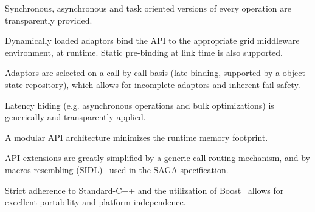   \begin{shortlist}
     
    \item Synchronous, asynchronous and task oriented versions of every
    operation are transparently provided.

    \item Dynamically loaded adaptors bind the API to the appropriate
    grid middleware environment, at runtime. Static pre-binding at link
    time is also supported.
          
    \item Adaptors are selected on a call-by-call basis (late binding,
    supported by a object state repository), which allows for
    incomplete adaptors and inherent fail safety.
    
    \item Latency hiding (e.g. asynchronous operations and bulk
    optimizations) is generically and transparently applied.

    \item A modular API architecture minimizes the runtime 
		memory footprint.
		
    \item API extensions are greatly simplified by a
    generic call routing mechanism, and by macros resembling 
    (SIDL)~\cite{sidl} used in the 
    SAGA specification. 
    
    \item Strict adherence to Standard-C++ and the utilization of 
    Boost~\cite{boost_website} allows for excellent portability 
    and platform independence.

  \end{shortlist}


